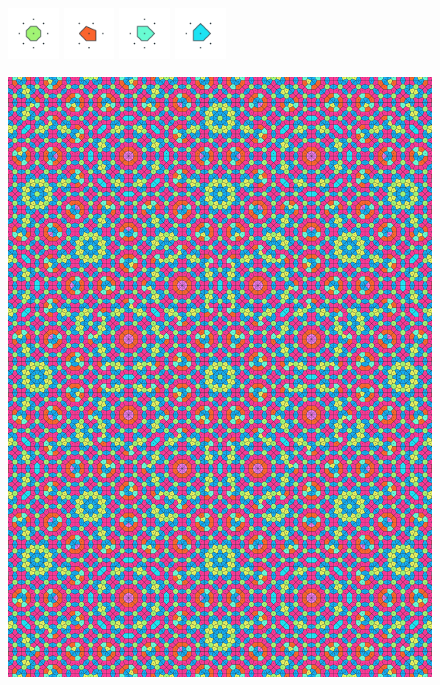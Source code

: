 \documentclass[text.tex]{subfiles}
\begin{document}
\begin{figure}[h!]
\includegraphics[width=0.12\textwidth]{img/results/octagon/octagon_145710_(1_2alpha_4)_005.pdf}
\includegraphics[width=0.12\textwidth]{img/results/octagon/octagon_145710_(1_2alpha_4)_006.pdf}
\includegraphics[width=0.12\textwidth]{img/results/octagon/octagon_145710_(1_2alpha_4)_007.pdf}
\includegraphics[width=0.12\textwidth]{img/results/octagon/octagon_145710_(1_2alpha_4)_008.pdf}
\end{figure}

\begin{figure}[h!]
\centering
\includegraphics[width=1\textwidth]{img/results/octagon/quasi_polygon-octagon_145710_(1_2alpha_4).pdf}
\end{figure}
\end{document}

